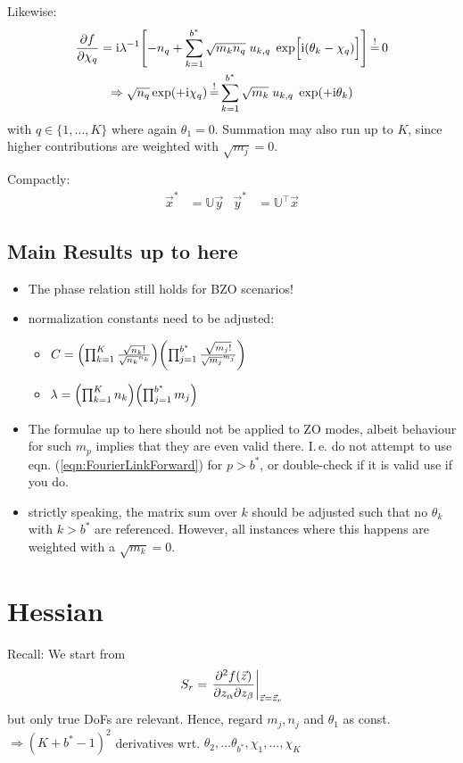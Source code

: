 \documentclass[
	english,
	a4paper,
	fontsize=10pt,
	parskip=half,
	titlepage=true,
	DIV=12,
	final
]{scrreprt}
\newcommand*{\Thus}{\ensuremath{\Rightarrow}\xspace}
\newcommand*{\transp}{\ensuremath{^\intercal}}
\newcommand*{\iunit}{\ensuremath{\mathrm{i}}}
\newcommand*{\equalCond}{  \mathop{=}\limits^!  }
\begin{document}
Likewise:
\begin{gather}
	\pdv{f}{\chi_q}
=
	\iunit\lambda^{-1}
	\qty[
		- n_q
		+
		\sum_{k=1}^{b^*}
			\sqrt{m_k n_q} \; u_{k,q} \; \exp[ \Big. \iunit(\theta_k - \chi_q) ]
	]
	\label{eqn:JacobianChi}
\equalCond
	0 \\
\Thus
	\sqrt{n_q} \exp(+\iunit \chi_q)
\equalCond
	\sum_{k=1}^{b^*}
	\sqrt{m_k} \; u_{k,q} \; \exp(+\iunit\theta_k)
	\label{eqn:FourierLinkBackward}
\end{gather}
with $q \in \{1, \ldots, K\}$ where again $\theta_1 = 0$. Summation may also run up to $K$, since higher contributions are weighted with $\sqrt{m_j} = 0$.

Compactly:
\begin{align}
	\vec{x}^{*} &= \mathbb{U} \vec{y}
&
	\vec{y}^{*} &= \mathbb{U}\transp \vec{x}
	\label{eqn:MatrixCondition}
\end{align}

\subsection{Main Results up to here}
\begin{itemize}
\item The phase relation still holds for BZO scenarios!
\item normalization constants need to be adjusted:
	\begin{itemize}
	\item $C =
	\qty( \prod_{k=1}^{K}
		\frac
			{ \sqrt{n_k!} }
			{ \sqrt{n_k}^{n_k} }
	)
	\qty( \prod_{j=1}^{b^*}
		\frac
			{ \sqrt{m_j!} }
			{ \sqrt{m_j}^{m_j} }
	)$
	\item $\lambda =
	\qty( \prod_{k=1}^{K}   n_k )
	\qty( \prod_{j=1}^{b^*} m_j )$
	\end{itemize}
\item The formulae up to here should not be applied to ZO modes, albeit behaviour for such $m_p$
	implies that they are even valid there. I.\,e. do not attempt to use eqn.
	(\ref{eqn:FourierLinkForward}) for $p > b^*$, or double-check if it is valid use if you do.
\item strictly speaking, the matrix sum over $k$ should be adjusted such that no $\theta_k$ with
	$k > b^*$ are referenced. However, all instances where this happens are weighted with a
	$\sqrt{m_k} = 0$.
\end{itemize}

\section{Hessian}
Recall: We start from
\begin{align}
	S_r
=
	\eval{
		\pdv{f(\vec{z})}%
			{z_\alpha}{z_\beta}
	}_{\vec{z} = \vec{z}_r}
\end{align}
but only true DoFs are relevant. Hence, regard $m_j, n_j$ and $\theta_1$ as const. \\
\Thus $(K + b^* - 1)^{2}$ derivatives wrt. $\theta_2, \ldots \theta_{b^*}, \chi_1, \ldots, \chi_K$
\end{document}
